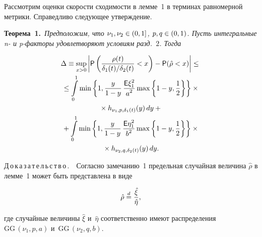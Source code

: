 \begin{multicols}{2}
Рассмотрим оценки ско\-рости схо\-ди\-мости в лемме~1 в терминах 
равномерной мет\-ри\-ки. Справедливо сле\-ду\-ющее утверж\-дение.

\smallskip

\noindent
\textbf{Теорема~1.}\
\textit{Предположим, что $\nu_1,\nu_2\hm\in(0,1]$, $p,q\hm\in(0,1)$. Пусть интегральные n- и
p-фак\-то\-ры удовле\-тво\-ря\-ют условиям разд.~$2$. Тогда}

\noindent
\begin{multline}
\Delta\equiv\sup\limits_{x>0}\left|{\sf P}\left(\displaystyle\frac{\displaystyle \rho(t)\mathstrut}{\displaystyle \delta_1(t)/\delta_2(t)\mathstrut}<x\right)-{\sf P}({\hat \rho}<x)\right|\le{}
\\
{}\le
\int\limits_0^1
\min\left\{1,
\displaystyle\frac{\displaystyle y\mathstrut}{\displaystyle 1-y\mathstrut}\,\displaystyle\frac{\displaystyle {\sf E} \xi_1^2\mathstrut}{\displaystyle a^2\mathstrut}\max\left\{1-y,\displaystyle\frac{\displaystyle 1\mathstrut}{\displaystyle 2\mathstrut}\right\}
\right\}\times{}\\
{}\times
h_{\nu_1,p,\delta_1 (t)}(y)\,dy
+{}
\\
{}+
\int\limits_0^1
\min\left\{1,
\displaystyle\frac{\displaystyle y\mathstrut}{\displaystyle 1-y\mathstrut}\,\displaystyle\frac{\displaystyle {\sf E} \eta_1^2\mathstrut}{\displaystyle b^2\mathstrut}\max\left\{1-y,\displaystyle\frac{\displaystyle 1\mathstrut}{\displaystyle 2\mathstrut}\right\}
\right\}\times{}\\
{}\times
h_{\nu_2,q,\delta_2 (t)}(y)\,dy.
\label{delta_speed}
\end{multline}


\noindent
Д\,о\,к\,а\,з\,а\,т\,е\,л\,ь\,с\,т\,в\,о\,.\ \ 
Согласно замечанию~1 предельная случайная величина ${\hat \rho}$ в 
лемме~1 может быть представлена в виде

\noindent
$$
{\hat \rho}\stackrel{d}{=}\displaystyle\frac{\displaystyle \hat\xi\mathstrut}{\displaystyle \hat\eta\mathstrut},
$$

\vspace*{-3pt}

\noindent
где случайные величины ${\hat\xi}$ и~${\hat\eta}$ соответственно имеют 
распределения $\mathrm{GG}\,(\nu_1,p,a)$ и~$\mathrm{GG}\,(\nu_2,q,b)$.


\end{multicols}
